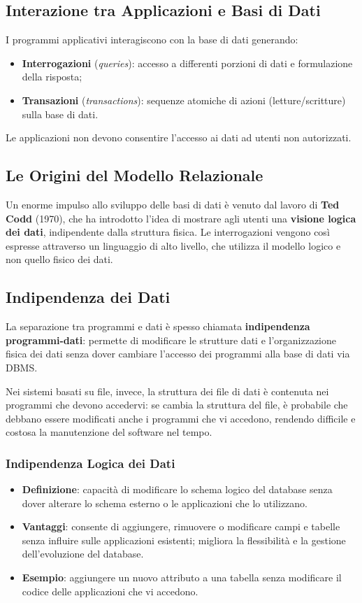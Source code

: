 \documentclass[12pt, a4paper]{article}
\begin{document}
\subsection{Interazione tra Applicazioni e Basi di Dati}

I programmi applicativi interagiscono con la base di dati generando:
\begin{itemize}
    \item \textbf{Interrogazioni} (\textit{queries}): accesso a differenti porzioni di dati e formulazione della risposta;
    \item \textbf{Transazioni} (\textit{transactions}): sequenze atomiche di azioni (letture/scritture) sulla base di dati.
\end{itemize}
Le applicazioni non devono consentire l'accesso ai dati ad utenti non autorizzati.

\subsection{Le Origini del Modello Relazionale}

Un enorme impulso allo sviluppo delle basi di dati è venuto dal lavoro di \textcolor{tocsec}{\textbf{Ted Codd}} (1970), che ha introdotto l'idea di mostrare agli utenti una \textbf{visione logica dei dati}, indipendente dalla struttura fisica. Le interrogazioni vengono così espresse attraverso un linguaggio di alto livello, che utilizza il modello logico e non quello fisico dei dati.

\subsection{Indipendenza dei Dati}

La separazione tra programmi e dati è spesso chiamata \textbf{indipendenza programmi-dati}: permette di modificare le strutture dati e l'organizzazione fisica dei dati senza dover cambiare l'accesso dei programmi alla base di dati via DBMS.

Nei sistemi basati su file, invece, la struttura dei file di dati è contenuta nei programmi che devono accedervi: se cambia la struttura del file, è probabile che debbano essere modificati anche i programmi che vi accedono, rendendo difficile e costosa la manutenzione del software nel tempo.

\subsubsection{Indipendenza Logica dei Dati}
\begin{itemize}
    \item \textbf{Definizione}: capacità di modificare lo schema logico del database senza dover alterare lo schema esterno o le applicazioni che lo utilizzano.
    \item \textbf{Vantaggi}: consente di aggiungere, rimuovere o modificare campi e tabelle senza influire sulle applicazioni esistenti; migliora la flessibilità e la gestione dell'evoluzione del database.
    \item \textbf{Esempio}: aggiungere un nuovo attributo a una tabella senza modificare il codice delle applicazioni che vi accedono.
\end{itemize}
\end{document}
